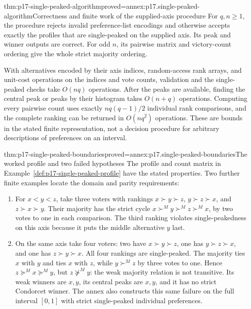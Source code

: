 \begin{hbtheorem}{thm:p17-single-peaked-algorithm}{proved=annex:p17.single-peaked-algorithm}{Correctness and finite work of the supplied-axis procedure}
For \(q,n\geq1\), the procedure rejects invalid preference-list
encodings and otherwise accepts exactly the profiles that are
single-peaked on the supplied axis. Its peak and winner outputs are
correct. For odd \(n\), its pairwise matrix and victory-count ordering
give the whole strict majority ordering.

With alternatives encoded by their axis indices, random-access rank
arrays, and unit-cost operations on the indices and vote counts,
validation and the single-peaked checks take \(O(nq)\) operations.
After the peaks are available, finding the central peak or peaks by
their histogram takes \(O(n+q)\) operations. Computing every pairwise
count uses exactly \(nq(q-1)/2\) individual rank comparisons, and
the complete ranking can be returned in \(O(nq^2)\) operations.
These are bounds in the stated finite representation, not a decision
procedure for arbitrary descriptions of preferences on an interval.
\end{hbtheorem}

\begin{hbtheorem}{thm:p17-single-peaked-boundaries}{proved=annex:p17.single-peaked-boundaries}{The worked profile and two failed hypotheses}
The profile and count matrix in Example~\ref{def:p17-single-peaked-profile}
have the stated properties. Two further finite examples locate the domain
and parity requirements:
\begin{enumerate}
\item For \(x<y<z\), take three voters with rankings
      \(x\succ y\succ z\), \(y\succ z\succ x\), and
      \(z\succ x\succ y\). Their majority has the strict cycle
      \(x\succ^M y\succ^M z\succ^M x\), by two votes to one
      in each comparison. The third ranking violates single-peakedness
      on this axis because it puts the middle alternative \(y\) last.
\item On the same axis take four voters: two have
      \(x\succ y\succ z\), one has \(y\succ z\succ x\),
      and one has \(z\succ y\succ x\). All four rankings are
      single-peaked. The majority ties \(x\) with \(y\) and
      ties \(x\) with \(z\), while \(y\succ^M z\) by three
      votes to one. Hence \(z\succeq^M x\succeq^M y\), but
      \(z\not\succeq^M y\): the weak majority relation is not
      transitive. Its weak winners are \(x,y\), its central peaks
      are \(x,y\), and it has no strict Condorcet winner.
      The annex also constructs this same failure on the full interval
      \([0,1]\) with strict single-peaked individual preferences.
\end{enumerate}
\end{hbtheorem}

